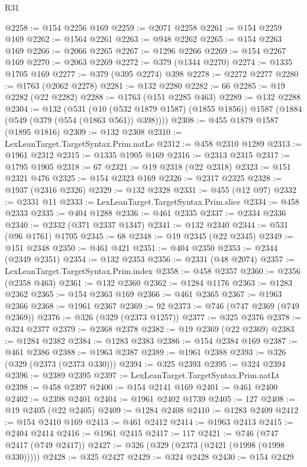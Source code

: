 \begin{lexlean}{R31}
\begin{coremodule}
@2258 := @154 @2256 @169
@2259 := @2071 @2258
@2261 := @154 @2259 @169
@2262 := @1564 @2261
@2263 := @948 @2262
@2265 := @154 @2263 @169
@2266 := @2066 @2265
@2267 := @1296 @2266
@2269 := @154 @2267 @169
@2270 := @2063 @2269
@2272 := @379 (@1344 @2270)
@2274 := @1335 @1705 @169
@2277 := @379 (@395 @2274) @398
@2278 := @2272 @2277
@2280 := @1763 (@2062 @2278)
@2281 := @132 @2280
@2282 := 66
@2285 := @19 @2282 (@22 @2282)
@2288 := @1763 (@151 @2285 @463)
@2289 := @132 @2288
@2304 := @132
    (@531
      (@10 (@532 @1879 @1587) (@1855 @1856))
      @1587
      (@1884 (@549 (@379 (@554 (@1863 @561)) @398))))
@2308 := @455 @1879 @1587 (@1895 @1816)
@2309 := @132 @2308
@2310 := LexLeanTarget.TargetSyntax.Prim.natLe
@2312 := @458 @2310 @1289
@2313 := @1961 @2312
@2315 := @1335 @1905 @169
@2316 := @2313 @2315
@2317 := @1795 @1905
@2318 := 67
@2321 := @19 @2318 (@22 @2318)
@2323 := @151 @2321 @476
@2325 := @154 @2323 @169
@2326 := @2317 @2325
@2328 := @1937 (@2316 @2326)
@2329 := @132 @2328
@2331 := @455 (@12 @97)
@2332 := @2331 @11
@2333 := LexLeanTarget.TargetSyntax.Prim.slice
@2334 := @458 @2333
@2335 := @404 @1288
@2336 := @461 @2335
@2337 := @2334 @2336
@2340 := @2332 (@371 @2337 @1347)
@2341 := @132 @2340
@2344 := @531 (@96 @1761) @1705
@2345 := 68
@2348 := @19 @2345 (@22 @2345)
@2349 := @151 @2348
@2350 := @461 @421
@2351 := @404 @2350
@2353 := @2344 (@2349 @2351)
@2354 := @132 @2353
@2356 := @2331 (@48 @2074)
@2357 := LexLeanTarget.TargetSyntax.Prim.index
@2358 := @458 @2357
@2360 := @2356 (@2358 @463)
@2361 := @132 @2360
@2362 := @1284 @1176
@2363 := @1283 @2362
@2365 := @154 @2363 @169
@2366 := @461 @2365
@2367 := @1963 @2366
@2368 := @1961 @2367
@2369 := 92
@2373 := @746 (@747 @2369 (@749 @2369))
@2376 := @326 (@329 (@2373 @1257))
@2377 := @325 @2376
@2378 := @324 @2377
@2379 := @2368 @2378
@2382 := @19 @2369 (@22 @2369)
@2383 := @1284 @2382
@2384 := @1283 @2383
@2386 := @154 @2384 @169
@2387 := @461 @2386
@2388 := @1963 @2387
@2389 := @1961 @2388
@2393 := @326 (@329 (@2373 (@2373 @330)))
@2394 := @325 @2393
@2395 := @324 @2394
@2396 := @2389 @2395
@2397 := LexLeanTarget.TargetSyntax.Prim.natLt
@2398 := @458 @2397
@2400 := @154 @2141 @169
@2401 := @461 @2400
@2402 := @2398 @2401
@2404 := @1961 @2402 @1739
@2405 := 127
@2408 := @19 @2405 (@22 @2405)
@2409 := @1284 @2408
@2410 := @1283 @2409
@2412 := @154 @2410 @169
@2413 := @461 @2412
@2414 := @1963 @2413
@2415 := @2404 @2414
@2416 := @1961 @2415
@2417 := 117
@2421 := @746 (@747 @2417 (@749 @2417))
@2427 := @326 (@329 (@2373 (@2421 (@1998 (@1998 @330)))))
@2428 := @325 @2427
@2429 := @324 @2428
@2430 := @154 @2429

\end{coremodule}
\end{lexlean}
